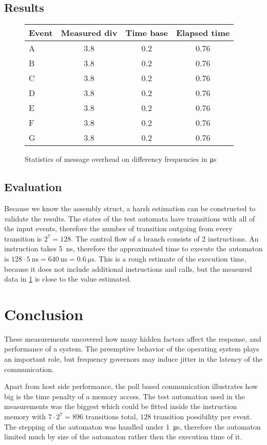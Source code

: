 \subsection{Results}

\begin{figure}
	\centering
	\caption{Statistics of message overhead on differency \cpu{} frequencies in \unit{\micro\second}}
	\begin{tabular}{l c c c}
		\toprule
		Event & Measured div & Time base & Elapsed time \\
		\midrule
		A & 3.8 & 0.2 & 0.76 \\
		B & 3.8 & 0.2 & 0.76 \\
		C & 3.8 & 0.2 & 0.76 \\
		D & 3.8 & 0.2 & 0.76 \\
		E & 3.8 & 0.2 & 0.76 \\
		F & 3.8 & 0.2 & 0.76 \\
		G & 3.8 & 0.2 & 0.76 \\
		\bottomrule
	\end{tabular}
\label{fig:rpmsg_exec_stats}
\end{figure}

\subsection{Evaluation}

Because we know the assembly struct, a harsh estimation can be constructed to validate the results. The states of the test automata have transitions with all of the input events, therefore the number of transition outgoing from every transition is $2^7=128$. The control flow of a branch consists of 2 instructions. An instruction takes \qty{5}{\nano\second}, therefore the approximated time to execute the automaton is $128 \cdot \qty{5}{\nano\second} = \qty{640}{\nano\second} = \qty{0.6}{\micro\second}$. This is a rough estimate of the execution time, because it does not include additional instructions and calls, but the measured data in \cref{fig:rpmsg_exec_stats} is close to the value estimated.

\section{Conclusion}

These measurements uncovered how many hidden factors affect the response, and performance of a system. The preemptive behavior of the operating system plays an important role, but frequency governors may induce jitter in the latency of the communication.

Apart from host side performance, the poll based communication illustrates how big is the time penalty of a  memory access. The test automation used in the measurements was the biggest which could be fitted inside the \pru{} instruction memory with $7 \cdot 2^7 = 896$ transitions total, $128$ transition possibility per event. The stepping of the automaton was handled under \qty{1}{\micro\second}, therefore the automaton limited much by size of the automaton rather then the execution time of it.
